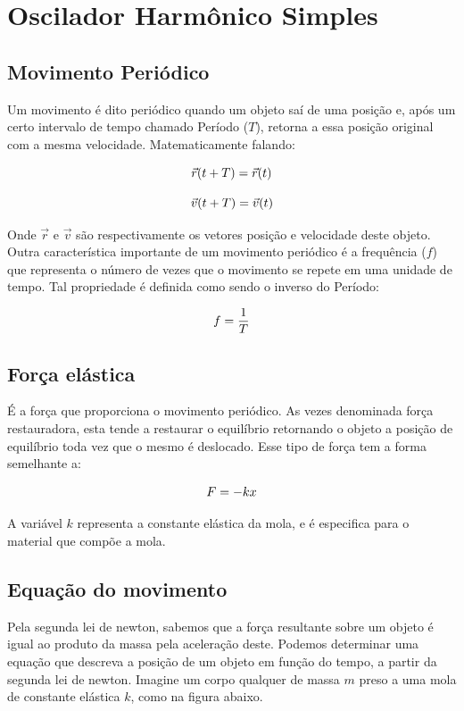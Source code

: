 \section{Oscilador Harmônico Simples}

\subsection{Movimento Periódico}

Um movimento é dito periódico quando um objeto saí de uma posição e, após um certo intervalo de tempo chamado Período ($T$), retorna a essa posição original com a mesma velocidade. Matematicamente falando:

\[ \large \vec{r}(t + T) = \vec{r}(t)\]

\[ \large \vec{v}(t + T) = \vec{v}(t)\]

Onde $\vec{r}$ e $\vec{v}$ são respectivamente os vetores posição e velocidade deste objeto.  
Outra característica importante de um movimento periódico é a frequência ($f$) que representa o número de vezes que o movimento se repete em uma unidade de tempo. Tal propriedade é definida como sendo o inverso do Período:

\[\Large f = \frac{1}{T}\]

\subsection{Força elástica}

É a força que proporciona o movimento periódico. As vezes denominada força restauradora, esta tende a restaurar o equilíbrio retornando o objeto a posição de equilíbrio toda vez que o mesmo é deslocado. Esse tipo de força tem a forma semelhante a:

\[ \large F = -kx\]

A variável $k$ representa a constante elástica da mola, e é especifica para o material que compõe a mola.

\subsection{Equação do movimento}

Pela segunda lei de newton, sabemos que a força resultante sobre um objeto é igual ao produto da massa pela aceleração deste.  Podemos determinar uma equação que descreva a posição de um objeto em função do tempo, a partir da segunda lei de newton. Imagine um corpo qualquer de massa $m$ preso a uma mola de constante elástica $k$, como na figura abaixo.

